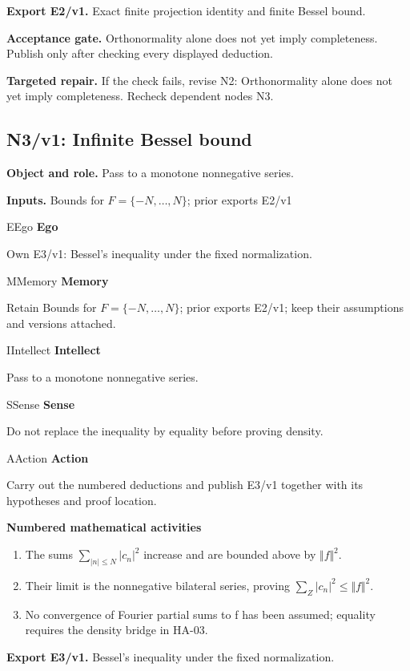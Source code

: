 \documentclass[preprint,12pt,aps,pra,showkeys,amsmath,amssymb,superscriptaddress,floatfix]{revtex4-2}
\theoremstyle{definition}
\theoremstyle{remark}
\newcommand{\mmfaculty}[3]{%
 \begin{mmfacultybox}{#1}{#2}
 {\sffamily\bfseries\color{MMBlue}#2}\par\smallskip #3
 \end{mmfacultybox}}
\newcommand{\field}[2]{\par\smallskip\noindent\textbf{#1.} #2\par}
\begin{document}
\field{Export E2/v1}{Exact finite projection identity and finite Bessel bound.}

\field{Acceptance gate}{Orthonormality alone does not yet imply completeness. Publish only after
checking every displayed deduction.}

\field{Targeted repair}{If the check fails, revise N2: Orthonormality alone does not yet imply
completeness. Recheck dependent nodes N3.}

\clearpage

\subsection{N3/v1: Infinite Bessel bound}

\field{Object and role}{Pass to a monotone nonnegative series.}

\field{Inputs}{Bounds for \(F=\{-N,\ldots ,N\}\); prior exports E2/v1}

\mmfaculty{E}{Ego}{Own E3/v1: Bessel's inequality under the fixed normalization.}

\mmfaculty{M}{Memory}{Retain Bounds for \(F=\{-N,\ldots ,N\}\); prior exports E2/v1; keep
their assumptions and versions attached.}

\mmfaculty{I}{Intellect}{Pass to a monotone nonnegative series.}

\mmfaculty{S}{Sense}{Do not replace the inequality by equality before proving density.}

\mmfaculty{A}{Action}{Carry out the numbered deductions and publish E3/v1 together with its
hypotheses and proof location.}

\smallskip\noindent\textbf{Numbered mathematical activities}

\begin{enumerate}[label=N3.\arabic*,leftmargin=3.4em]

\item The sums \(\sum _{|n|\le N}|c_n|^{2}\) increase and are bounded above by
\(\Vert f\Vert ^{2}\).

\item Their limit is the nonnegative bilateral series, proving
\(\sum _Z|c_n|^{2}\le \Vert f\Vert ^{2}\).

\item No convergence of Fourier partial sums to f has been assumed; equality
requires the density bridge in HA-03.

\end{enumerate}

\field{Export E3/v1}{Bessel's inequality under the fixed normalization.}
\end{document}
